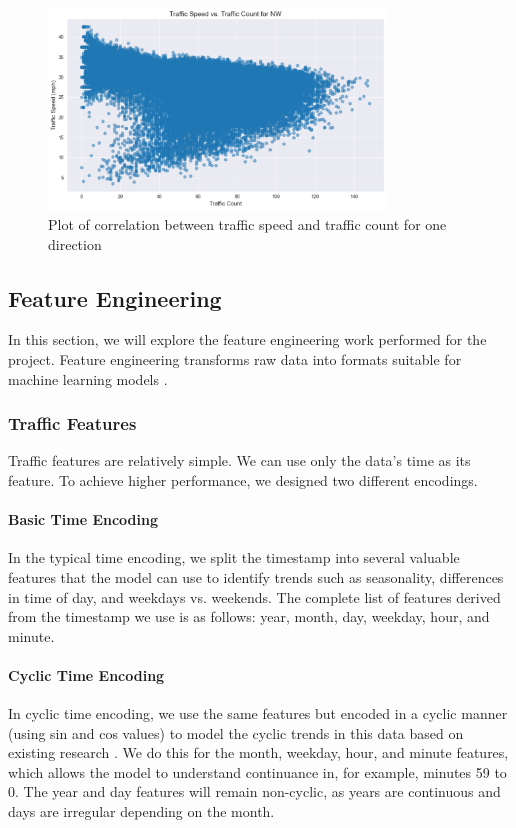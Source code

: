 \begin{figure}[!ht]
  \centering
  \includegraphics[width=0.8\textwidth]{images/design-implementation/correlation.pdf}
  \caption{Plot of correlation between traffic speed and traffic count for one direction}
  \label{fig:correlation}
\end{figure}


\subsection{Feature Engineering}
In this section, we will explore the feature engineering work performed for the project. Feature engineering transforms raw data into formats suitable for machine learning models \cite{noauthor_feature_2024}.

\subsubsection{Traffic Features}
Traffic features are relatively simple. We can use only the data's time as its feature. To achieve higher performance, we designed two different encodings.

\paragraph{Basic Time Encoding}
In the typical time encoding, we split the timestamp into several valuable features that the model can use to identify trends such as seasonality, differences in time of day, and weekdays vs. weekends. The complete list of features derived from the timestamp we use is as follows: year, month, day, weekday, hour, and minute.

\paragraph{Cyclic Time Encoding}
In cyclic time encoding, we use the same features but encoded in a cyclic manner (using sin and cos values) to model the cyclic trends in this data based on existing research \cite{pelletier_cyclical_2024}. We do this for the month, weekday, hour, and minute features, which allows the model to understand continuance in, for example, minutes 59 to 0. The year and day features will remain non-cyclic, as years are continuous and days are irregular depending on the month.

